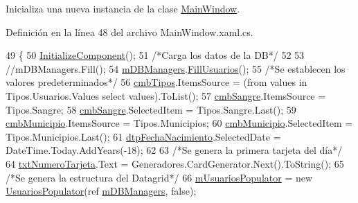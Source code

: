 Inicializa una nueva instancia de la clase \hyperlink{class_proyecto___integrador__3_1_1_main_window}{Main\-Window}. 



Definición en la línea 48 del archivo Main\-Window.\-xaml.\-cs.


\begin{DoxyCode}
49         \{
50             \hyperlink{class_proyecto___integrador__3_1_1_main_window_ab7151625146f0c268d8404f4ab8869bc}{InitializeComponent}();
51             \textcolor{comment}{/*Carga los datos de la DB*/}
52 
53             \textcolor{comment}{//mDBManagers.Fill();}
54             \hyperlink{class_proyecto___integrador__3_1_1_main_window_ad2b88cf68cee145343b2da734c94d8d5}{mDBManagers}.\hyperlink{class_proyecto___integrador__3_1_1_d_b_managers_a27dce97a7e23ba80a56b545ccfeb73ee}{FillUsuarios}();
55             \textcolor{comment}{/*Se establecen los valores predeterminados*/}
56             \hyperlink{class_proyecto___integrador__3_1_1_main_window_a6ffda9fa41aae566606ef782be37ed11}{cmbTipos}.ItemsSource = (from values in Tipos.Usuarios.Values select values).ToList();
57             \hyperlink{class_proyecto___integrador__3_1_1_main_window_a78f29679759491825a6a30ad89e8a867}{cmbSangre}.ItemsSource = Tipos.Sangre;
58             \hyperlink{class_proyecto___integrador__3_1_1_main_window_a78f29679759491825a6a30ad89e8a867}{cmbSangre}.SelectedItem = Tipos.Sangre.Last();
59             \hyperlink{class_proyecto___integrador__3_1_1_main_window_a6fad73b5f18398cb423384f61d36ff9a}{cmbMunicipio}.ItemsSource = Tipos.Municipios;
60             \hyperlink{class_proyecto___integrador__3_1_1_main_window_a6fad73b5f18398cb423384f61d36ff9a}{cmbMunicipio}.SelectedItem = Tipos.Municipios.Last();
61             \hyperlink{class_proyecto___integrador__3_1_1_main_window_a366d1c04863cd090fb2a941de8adbd3d}{dtpFechaNacimiento}.SelectedDate = DateTime.Today.AddYears(-18);
62             
63             \textcolor{comment}{/*Se genera la primera tarjeta del día*/}
64             \hyperlink{class_proyecto___integrador__3_1_1_main_window_aa002c65e1d03d58932cae92c7523198a}{txtNumeroTarjeta}.Text = Generadores.CardGenerator.Next().ToString();
65             \textcolor{comment}{/*Se genera la estructura del Datagrid*/}
66             \hyperlink{class_proyecto___integrador__3_1_1_main_window_a3c9586e06a8edee79c1217a3985b4b68}{mUsuariosPopulator} = \textcolor{keyword}{new} \hyperlink{_main_window_8xaml_8cs_a9b6fea16165d9a40204bde2f9eb53148}{UsuariosPopulator}(ref 
      \hyperlink{class_proyecto___integrador__3_1_1_main_window_ad2b88cf68cee145343b2da734c94d8d5}{mDBManagers}, \textcolor{keyword}{false});

\end{DoxyCode}
